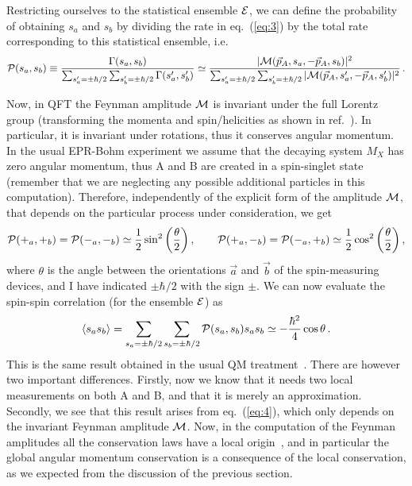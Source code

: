 \documentclass[published]{JHEP3}
\begin{document}
Restricting ourselves to the statistical ensemble ${\cal E}$, we can
define the probability of obtaining $s_a$ and $s_b$ by dividing the
rate in eq.~(\ref{eq:3}) by the total rate corresponding to this
statistical ensemble, i.e.\ 
\begin{equation} 
{\cal P}(s_a,s_b) \equiv \frac{\Gamma(s_a,s_b)}{
\sum_{s'_a=\pm\hbar/2}\sum_{s'_b=\pm\hbar/2}\Gamma(s'_a,s'_b)}
\simeq\frac{\vert {\cal M} (\vec p_A,s_a,-\vec p_A,s_b)\vert^2}
{\sum_{s'_a=\pm\hbar/2}\sum_{s'_b=\pm\hbar/2}\vert {\cal M} (\vec
p_A,s'_a,-\vec p_A,s'_b)\vert^2}\,. \label{eq:4}
\end{equation}

Now, in QFT the Feynman amplitude ${\cal M}$ is invariant under the
full Lorentz group (transforming the momenta and spin/helicities as
shown in ref.~\cite{WeinbookI}). In particular, it is invariant under
rotations, thus it conserves angular momentum. In the usual EPR-Bohm
experiment we assume that the decaying system $M_X$ has zero angular
momentum, thus A and B are created in a spin-singlet state (remember
that we are neglecting any possible additional particles in this
computation).  Therefore, independently of the explicit form of the
amplitude ${\cal M}$, that depends on the particular process under
consideration, we get
\begin{equation}
{\cal P}(+_a,+_b)={\cal
P}(-_a,-_b)\simeq\frac12\sin^2\left(\frac\theta2\right),\qquad 
{\cal P}(+_a,-_b)={\cal P}(-_a,+_b)\simeq\frac12
\cos^2\left(\frac\theta2\right),
\label{eq:5}
\end{equation}
where $\theta$ is the angle between the orientations $\vec a$ and
$\vec b$ of the spin-measuring devices, and I have indicated
$\pm\hbar/2$ with the sign $\pm$. We can now evaluate the
spin-spin correlation (for the ensemble ${\cal E}$) as
\begin{equation}
\langle s_a s_b \rangle =
\sum_{s_a=\pm\hbar/2}\sum_{s_b=\pm\hbar/2}{\cal P}(s_a,s_b) s_a
s_b \simeq -\frac{\hbar^2}{4}\cos\theta\,. \label{eq:6}
\end{equation}
This is the same result obtained in the usual QM
treatment~\cite{BJ,Laloe}. There are however two important
differences.  Firstly, now we know that it needs two local
measurements on both A and B, and that it is merely an
approximation. Secondly, we see that this result arises from
eq.~(\ref{eq:4}), which only depends on the invariant Feynman
amplitude ${\cal M}$. Now, in the computation of the Feynman
amplitudes all the conservation laws have a local
origin~\cite{WeinbookI,WeinbookII}, and in particular the global
angular momentum conservation is a consequence of the local
conservation, as we expected from the discussion of the previous
section.
\end{document}
